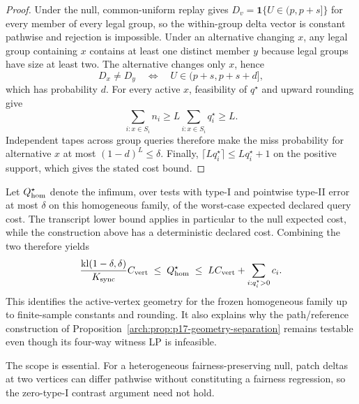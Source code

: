 \begin{proof}
Under the null, common-uniform replay gives
$D_v=\mathbf 1\{U\in(p,p+s]\}$ for every member of every legal group, so
the within-group delta vector is constant pathwise and rejection is impossible.
Under an alternative changing $x$, any legal group containing $x$ contains at
least one distinct member $y$ because legal groups have size at least two.
The alternative changes only $x$, hence
\begin{equation}\label{eq:appendix-07-open-problems-011}
D_x\ne D_y
\quad\Longleftrightarrow\quad
U\in(p+s,p+s+d],
\end{equation}
which has probability $d$.  For every active $x$, feasibility of $q^\star$
and upward rounding give
\begin{equation}\label{eq:appendix-07-open-problems-012}
\sum_{i:x\in S_i}n_i
\ge L\sum_{i:x\in S_i}q_i^\star
\ge L.
\end{equation}
Independent tapes across group queries therefore make the miss probability for
alternative $x$ at most $(1-d)^L\le\delta$.  Finally,
$\lceil Lq_i^\star\rceil\le Lq_i^\star+1$ on the positive support,
which gives the stated cost bound.
\end{proof}

Let $Q^\star_{\rm hom}$ denote the infimum, over tests with type-I and
pointwise type-II error at most $\delta$ on this homogeneous family, of the
worst-case expected declared query cost.  The transcript lower bound applies in
particular to the null expected cost, while the construction above has a
deterministic declared cost.  Combining the two therefore yields
\begin{equation}\label{eq:appendix-07-open-problems-013}
\frac{\mathrm{kl}(1-\delta,\delta)}{K_{\rm sync}}C_{\rm vert}
\;\le\;
Q^\star_{\rm hom}
\;\le\;
L C_{\rm vert}+\sum_{i:q_i^\star>0}c_i.
\end{equation}
This identifies the active-vertex geometry for the frozen homogeneous family
up to finite-sample constants and rounding.  It also explains why the
path/reference construction of Proposition~\ref{arch:prop:p17-geometry-separation}
remains testable even though its four-way witness LP is infeasible.

The scope is essential.  For a heterogeneous fairness-preserving null, patch
deltas at two vertices can differ pathwise without constituting a fairness
regression, so the zero-type-I contrast argument need not hold.


